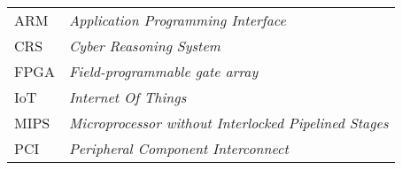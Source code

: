 \begin{longtable}{ll}
  ARM & \textit{Application Programming Interface} \\
  CRS & \textit{Cyber Reasoning System} \\
  FPGA & \textit{Field-programmable gate array} \\
  IoT & \textit{Internet Of Things} \\
  MIPS & \textit{Microprocessor without Interlocked Pipelined Stages} \\
  PCI & \textit{Peripheral Component Interconnect} \\
\end{longtable}


